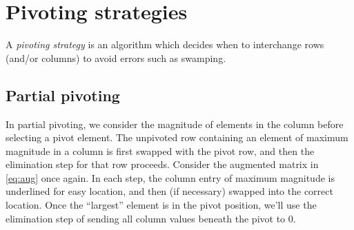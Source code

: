 \documentclass[m3380-lec-main.tex]{subfiles}
\begin{document}
\section{Pivoting strategies}
A \emph{pivoting strategy} is an algorithm which decides when to interchange rows (and/or columns) to avoid errors such as swamping. 

\subsection{Partial pivoting}
In partial pivoting, we consider the magnitude of elements in the column before selecting a pivot element. The unpivoted row containing an element of maximum magnitude in a column is first swapped with the pivot row, and then the elimination step for that row proceeds. Consider the augmented matrix in \autoref{eq:aug} once again. In each step, the column entry of maximum magnitude is underlined for easy location, and then (if necessary) swapped into the correct location. Once the ``largest'' element is in the pivot position, we'll use the elimination step of sending all column values beneath the pivot to 0.
\end{document}
